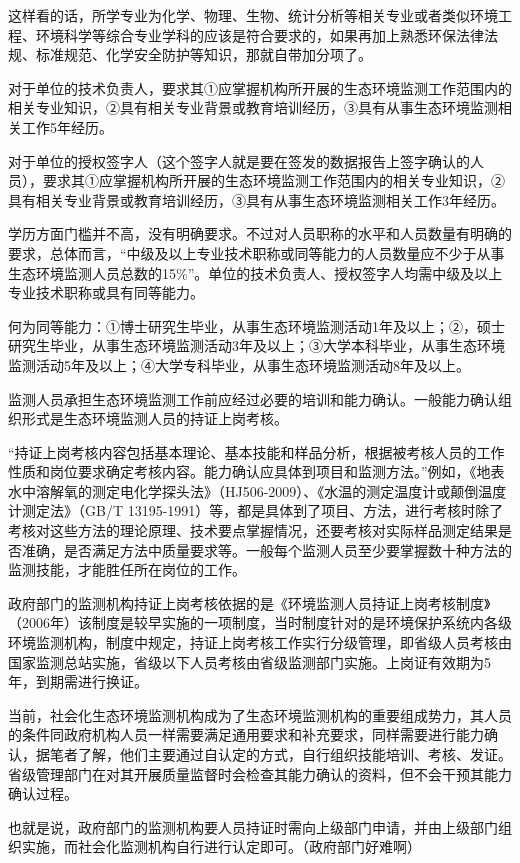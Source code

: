 \documentclass[]{book}
\begin{document}
这样看的话，所学专业为化学、物理、生物、统计分析等相关专业或者类似环境工程、环境科学等综合专业学科的应该是符合要求的，如果再加上熟悉环保法律法规、标准规范、化学安全防护等知识，那就自带加分项了。

对于单位的技术负责人，要求其①应掌握机构所开展的生态环境监测工作范围内的相关专业知识，②具有相关专业背景或教育培训经历，③具有从事生态环境监测相关工作5年经历。

对于单位的授权签字人（这个签字人就是要在签发的数据报告上签字确认的人员），要求其①应掌握机构所开展的生态环境监测工作范围内的相关专业知识，②具有相关专业背景或教育培训经历，③具有从事生态环境监测相关工作3年经历。

学历方面门槛并不高，没有明确要求。不过对人员职称的水平和人员数量有明确的要求，总体而言，``中级及以上专业技术职称或同等能力的人员数量应不少于从事生态环境监测人员总数的15\%''。单位的技术负责人、授权签字人均需中级及以上专业技术职称或具有同等能力。

何为同等能力：①博士研究生毕业，从事生态环境监测活动1年及以上；②，硕士研究生毕业，从事生态环境监测活动3年及以上；③大学本科毕业，从事生态环境监测活动5年及以上；④大学专科毕业，从事生态环境监测活动8年及以上。

监测人员承担生态环境监测工作前应经过必要的培训和能力确认。一般能力确认组织形式是生态环境监测人员的持证上岗考核。

``持证上岗考核内容包括基本理论、基本技能和样品分析，根据被考核人员的工作性质和岗位要求确定考核内容。能力确认应具体到项目和监测方法。''例如，《地表水中溶解氧的测定电化学探头法》（HJ506-2009）、《水温的测定温度计或颠倒温度计测定法》（GB/T 13195-1991）等，都是具体到了项目、方法，进行考核时除了考核对这些方法的理论原理、技术要点掌握情况，还要考核对实际样品测定结果是否准确，是否满足方法中质量要求等。一般每个监测人员至少要掌握数十种方法的监测技能，才能胜任所在岗位的工作。

政府部门的监测机构持证上岗考核依据的是《环境监测人员持证上岗考核制度》（2006年）该制度是较早实施的一项制度，当时制度针对的是环境保护系统内各级环境监测机构，制度中规定，持证上岗考核工作实行分级管理，即省级人员考核由国家监测总站实施，省级以下人员考核由省级监测部门实施。上岗证有效期为5年，到期需进行换证。

当前，社会化生态环境监测机构成为了生态环境监测机构的重要组成势力，其人员的条件同政府机构人员一样需要满足通用要求和补充要求，同样需要进行能力确认，据笔者了解，他们主要通过自认定的方式，自行组织技能培训、考核、发证。省级管理部门在对其开展质量监督时会检查其能力确认的资料，但不会干预其能力确认过程。

也就是说，政府部门的监测机构要人员持证时需向上级部门申请，并由上级部门组织实施，而社会化监测机构自行进行认定即可。（政府部门好难啊）
\end{document}
